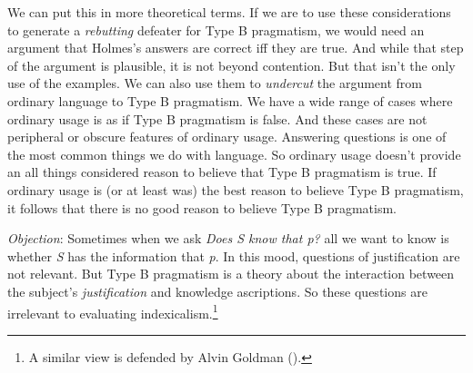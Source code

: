 \documentclass[
  10pt,
  letterpaper,
  DIV=11,
  numbers=noendperiod,
  twoside]{scrartcl}
\begin{document}
We can put this in more theoretical terms. If we are to use these
considerations to generate a \emph{rebutting} defeater for Type B
pragmatism, we would need an argument that Holmes's answers are correct
iff they are true. And while that step of the argument is plausible, it
is not beyond contention. But that isn't the only use of the examples.
We can also use them to \emph{undercut} the argument from ordinary
language to Type B pragmatism. We have a wide range of cases where
ordinary usage is as if Type B pragmatism is false. And these cases are
not peripheral or obscure features of ordinary usage. Answering
questions is one of the most common things we do with language. So
ordinary usage doesn't provide an all things considered reason to
believe that Type B pragmatism is true. If ordinary usage is (or at
least was) the best reason to believe Type B pragmatism, it follows that
there is no good reason to believe Type B pragmatism.

\emph{Objection}: Sometimes when we ask \emph{Does S know that p?} all
we want to know is whether \emph{S} has the information that \emph{p}.
In this mood, questions of justification are not relevant. But Type B
pragmatism is a theory about the interaction between the subject's
\emph{justification} and knowledge ascriptions. So these questions are
irrelevant to evaluating indexicalism.\footnote{A similar view is
  defended by Alvin Goldman ().}
\end{document}

